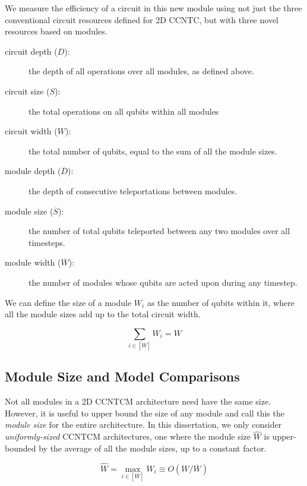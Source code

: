 We measure the efficiency of a circuit in this new module using not just
the three conventional circuit resources defined for \textsf{2D CCNTC}, but with three novel resources
based on modules.

\begin{description}

\item[circuit depth ($D$):] the depth of all operations over all modules,
as defined above.
\item[circuit size ($S$):] the total operations on all qubits within all
modules
\item[circuit width ($W$):] the total number of qubits, equal to the sum of all the module sizes.
\item[module depth ($\overline{D}$):] the depth of consecutive teleportations between modules.
\item[module size ($\overline{S}$):] the number of total qubits teleported between any two modules over all timesteps.
\item[module width ($\overline{W}$):] the number of modules whose qubits are
acted upon during any timestep.

\end{description}

We can define the size of a module $W_i$ as the number of qubits within it,
where all the module sizes add up to the total circuit width.

\begin{equation}
\sum_{i \in [\overline{W}]} W_i = W
\end{equation}

\subsection{Module Size and Model Comparisons}

Not all modules in a \textsf{2D CCNTCM} architecture need have the same
size. However, it is useful to upper bound the size of any module and call
this the \emph{module size} for the entire architecture. In this 
dissertation, we only consider \emph{uniformly-sized} \textsf{CCNTCM} architectures, one where
the module size $\hat{W}$
is upper-bounded by the average of all the module sizes, up to a constant
factor.

\begin{equation}
\hat{W} = \max_{i \in [\overline{W}]} W_i \equiv O(W / \overline{W})
\end{equation}

